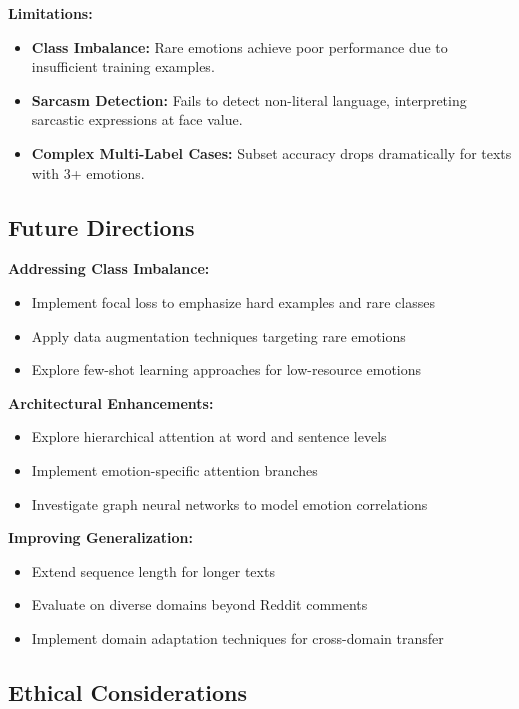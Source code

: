 \documentclass[12pt,a4paper]{article}
\begin{document}
\textbf{Limitations:}
\begin{itemize}
    \item \textbf{Class Imbalance:} Rare emotions achieve poor performance due to insufficient training examples.
    \item \textbf{Sarcasm Detection:} Fails to detect non-literal language, interpreting sarcastic expressions at face value.
    \item \textbf{Complex Multi-Label Cases:} Subset accuracy drops dramatically for texts with 3+ emotions.
\end{itemize}

\subsection{Future Directions}

\textbf{Addressing Class Imbalance:}
\begin{itemize}
    \item Implement focal loss \cite{lin2020focal} to emphasize hard examples and rare classes
    \item Apply data augmentation techniques targeting rare emotions
    \item Explore few-shot learning approaches for low-resource emotions \cite{chen2023fewshot}
\end{itemize}

\textbf{Architectural Enhancements:}
\begin{itemize}
    \item Explore hierarchical attention at word and sentence levels
    \item Implement emotion-specific attention branches
    \item Investigate graph neural networks to model emotion correlations
\end{itemize}

\textbf{Improving Generalization:}
\begin{itemize}
    \item Extend sequence length for longer texts
    \item Evaluate on diverse domains beyond Reddit comments
    \item Implement domain adaptation techniques for cross-domain transfer
\end{itemize}

\subsection{Ethical Considerations}
\end{document}
